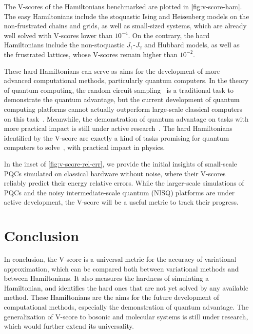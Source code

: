 The V-scores of the Hamiltonians benchmarked are plotted in \cref{fig:v-score-ham}. The easy Hamiltonians include the stoquastic Ising and Heisenberg models on the non-frustrated chains and grids, as well as small-sized systems, which are already well solved with V-scores lower than $10^{-4}$. On the contrary, the hard Hamiltonians include the non-stoquastic $J_1$-$J_2$ and Hubbard models, as well as the frustrated lattices, whose V-scores remain higher than $10^{-2}$.

These hard Hamiltonians can serve as aims for the development of more advanced computational methods, particularly quantum computers. In the theory of quantum computing, the random circuit sampling~\cite{lund2017quantum, boixo2018characterizing, arute2019quantum} is a traditional task to demonstrate the quantum advantage, but the current development of quantum computing platforms cannot actually outperform large-scale classical computers on this task~\cite{gao2021limitations, aharonov2022polynomial, pan2022solving, zhao2024leapfrogging}. Meanwhile, the demonstration of quantum advantage on tasks with more practical impact is still under active research~\cite{daley2022practical}. The hard Hamiltonians identified by the V-score are exactly a kind of tasks promising for quantum computers to solve~\cite{feynman1982simulating}, with practical impact in physics.

In the inset of \cref{fig:v-score-rel-err}, we provide the initial insights of small-scale PQCs simulated on classical hardware without noise, where their V-scores reliably predict their energy relative errors. While the larger-scale simulations of PQCs and the noisy intermediate-scale quantum (NISQ) platforms are under active development, the V-score will be a useful metric to track their progress.

\section{Conclusion}

In conclusion, the V-score is a universal metric for the accuracy of variational approximation, which can be compared both between variational methods and between Hamiltonians. It also measures the hardness of simulating a Hamiltonian, and identifies the hard ones that are not yet solved by any available method. These Hamiltonians are the aims for the future development of computational methods, especially the demonstration of quantum advantage. The generalization of V-score to bosonic and molecular systems is still under research, which would further extend its universality.

